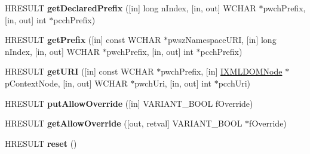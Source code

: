 \begin{DoxyCompactItemize}
\item 
\mbox{\label{interface_m_s_x_m_l2_1_1_i_m_x_namespace_manager_a5f7f412eff4e7b88d325d294c6521a93}} 
H\+R\+E\+S\+U\+LT {\bfseries get\+Declared\+Prefix} (\mbox{[}in\mbox{]} long n\+Index, \mbox{[}in, out\mbox{]} W\+C\+H\+AR $\ast$pwch\+Prefix, \mbox{[}in, out\mbox{]} int $\ast$pcch\+Prefix)
\item 
\mbox{\label{interface_m_s_x_m_l2_1_1_i_m_x_namespace_manager_a7c2985178d6e7a2aba6dda34e37c82a5}} 
H\+R\+E\+S\+U\+LT {\bfseries get\+Prefix} (\mbox{[}in\mbox{]} const W\+C\+H\+AR $\ast$pwsz\+Namespace\+U\+RI, \mbox{[}in\mbox{]} long n\+Index, \mbox{[}in, out\mbox{]} W\+C\+H\+AR $\ast$pwch\+Prefix, \mbox{[}in, out\mbox{]} int $\ast$pcch\+Prefix)
\item 
\mbox{\label{interface_m_s_x_m_l2_1_1_i_m_x_namespace_manager_aa67b5c1118099d7eb5de2dce313bb46c}} 
H\+R\+E\+S\+U\+LT {\bfseries get\+U\+RI} (\mbox{[}in\mbox{]} const W\+C\+H\+AR $\ast$pwch\+Prefix, \mbox{[}in\mbox{]} \hyperlink{interface_m_s_x_m_l2_1_1_i_x_m_l_d_o_m_node}{I\+X\+M\+L\+D\+O\+M\+Node} $\ast$p\+Context\+Node, \mbox{[}in, out\mbox{]} W\+C\+H\+AR $\ast$pwch\+Uri, \mbox{[}in, out\mbox{]} int $\ast$pcch\+Uri)
\item 
\mbox{\label{interface_m_s_x_m_l2_1_1_i_m_x_namespace_manager_a7010327ea2b84999c33d2cdef0eb25c3}} 
H\+R\+E\+S\+U\+LT {\bfseries put\+Allow\+Override} (\mbox{[}in\mbox{]} V\+A\+R\+I\+A\+N\+T\+\_\+\+B\+O\+OL f\+Override)
\item 
\mbox{\label{interface_m_s_x_m_l2_1_1_i_m_x_namespace_manager_a4bc4fe125f2368a55a2d54bce678effe}} 
H\+R\+E\+S\+U\+LT {\bfseries get\+Allow\+Override} (\mbox{[}out, retval\mbox{]} V\+A\+R\+I\+A\+N\+T\+\_\+\+B\+O\+OL $\ast$f\+Override)
\item 
\mbox{\label{interface_m_s_x_m_l2_1_1_i_m_x_namespace_manager_ae355bf6f86730d5aabfb238344d7ba13}} 
H\+R\+E\+S\+U\+LT {\bfseries reset} ()
\item 
\mbox{\label{interface_m_s_x_m_l2_1_1_i_m_x_namespace_manager_a08d39f648502ef258194bac10147dfad}} 

\end{DoxyCompactItemize}
